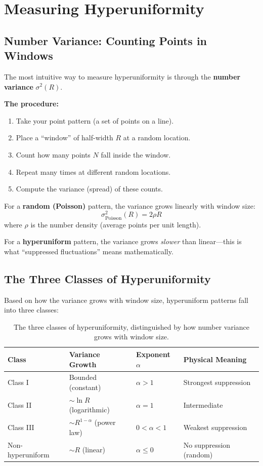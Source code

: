 \documentclass[11pt,letterpaper]{article}
\begin{document}
\section{Measuring Hyperuniformity}

\subsection{Number Variance: Counting Points in Windows}

The most intuitive way to measure hyperuniformity is through the \textbf{number variance} $\sigma^2(R)$.

\textbf{The procedure:}
\begin{enumerate}
    \item Take your point pattern (a set of points on a line).
    \item Place a ``window'' of half-width $R$ at a random location.
    \item Count how many points $N$ fall inside the window.
    \item Repeat many times at different random locations.
    \item Compute the variance (spread) of these counts.
\end{enumerate}

For a \textbf{random (Poisson)} pattern, the variance grows linearly with window size:
\[
\sigma^2_{\text{Poisson}}(R) = 2\rho R
\]
where $\rho$ is the number density (average points per unit length).

For a \textbf{hyperuniform} pattern, the variance grows \textit{slower} than linear---this is what ``suppressed fluctuations'' means mathematically.

\subsection{The Three Classes of Hyperuniformity}

Based on how the variance grows with window size, hyperuniform patterns fall into three classes:

\begin{table}[H]
\centering
\begin{tabular}{llll}
\toprule
\textbf{Class} & \textbf{Variance Growth} & \textbf{Exponent $\alpha$} & \textbf{Physical Meaning} \\
\midrule
Class I & Bounded (constant) & $\alpha > 1$ & Strongest suppression \\
Class II & $\sim \ln R$ (logarithmic) & $\alpha = 1$ & Intermediate \\
Class III & $\sim R^{1-\alpha}$ (power law) & $0 < \alpha < 1$ & Weakest suppression \\
\midrule
Non-hyperuniform & $\sim R$ (linear) & $\alpha \leq 0$ & No suppression (random) \\
\bottomrule
\end{tabular}
\caption{The three classes of hyperuniformity, distinguished by how number variance grows with window size.}
\end{table}
\end{document}
